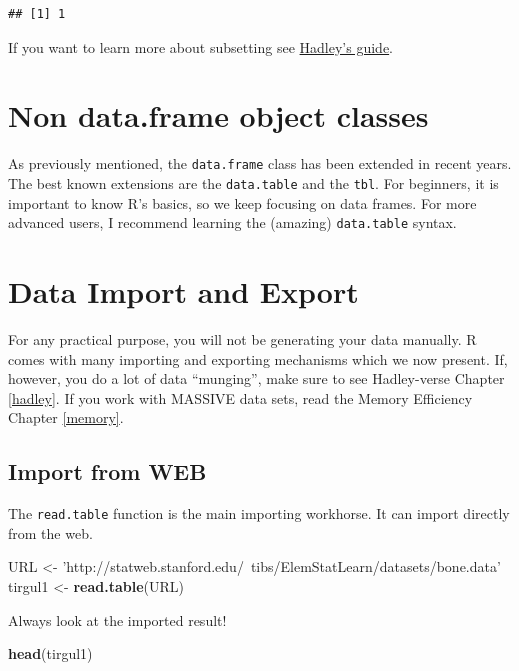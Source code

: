 \documentclass[]{book}
\newenvironment{Shaded}{\begin{snugshade}}{\end{snugshade}}
\newcommand{\KeywordTok}[1]{\textcolor[rgb]{0.13,0.29,0.53}{\textbf{#1}}}
\newcommand{\StringTok}[1]{\textcolor[rgb]{0.31,0.60,0.02}{#1}}
\newcommand{\NormalTok}[1]{#1}
\theoremstyle{definition}
\theoremstyle{definition}
\theoremstyle{definition}
\theoremstyle{remark}
\begin{document}
\begin{verbatim}
## [1] 1
\end{verbatim}

If you want to learn more about subsetting see
\href{http://adv-r.had.co.nz/Subsetting.html}{Hadley's guide}.

\section{Non data.frame object
classes}\label{non-data.frame-object-classes}

As previously mentioned, the \texttt{data.frame} class has been extended
in recent years. The best known extensions are the \texttt{data.table}
and the \texttt{tbl}. For beginners, it is important to know R's basics,
so we keep focusing on data frames. For more advanced users, I recommend
learning the (amazing) \texttt{data.table} syntax.

\section{Data Import and Export}\label{data-import-and-export}

For any practical purpose, you will not be generating your data
manually. R comes with many importing and exporting mechanisms which we
now present. If, however, you do a lot of data ``munging'', make sure to
see Hadley-verse Chapter \ref{hadley}. If you work with MASSIVE data
sets, read the Memory Efficiency Chapter \ref{memory}.

\subsection{Import from WEB}\label{import-from-web}

The \texttt{read.table} function is the main importing workhorse. It can
import directly from the web.

\begin{Shaded}
\begin{Highlighting}[]
\NormalTok{URL <-}\StringTok{ 'http://statweb.stanford.edu/~tibs/ElemStatLearn/datasets/bone.data'}
\NormalTok{tirgul1 <-}\StringTok{ }\KeywordTok{read.table}\NormalTok{(URL)}
\end{Highlighting}
\end{Shaded}

Always look at the imported result!

\begin{Shaded}
\begin{Highlighting}[]
\KeywordTok{head}\NormalTok{(tirgul1)}
\end{Highlighting}
\end{Shaded}
\end{document}
